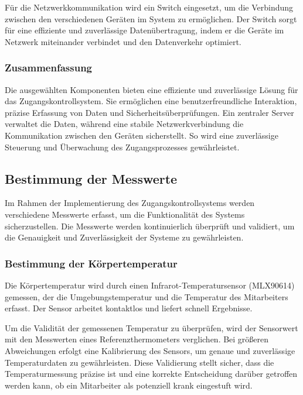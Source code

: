 Für die Netzwerkkommunikation wird ein Switch eingesetzt, um die Verbindung zwischen den verschiedenen Geräten im System zu ermöglichen. Der Switch sorgt für eine effiziente und zuverlässige Datenübertragung, indem er die Geräte im Netzwerk miteinander verbindet und den Datenverkehr optimiert.

\subsubsection{Zusammenfassung}

Die ausgewählten Komponenten bieten eine effiziente und zuverlässige Lösung für das Zugangskontrollsystem. Sie ermöglichen eine benutzerfreundliche Interaktion, präzise Erfassung von Daten und Sicherheitsüberprüfungen. Ein zentraler Server verwaltet die Daten, während eine stabile Netzwerkverbindung die Kommunikation zwischen den Geräten sicherstellt. So wird eine zuverlässige Steuerung und Überwachung des Zugangsprozesses gewährleistet.


\subsection{Bestimmung der Messwerte}

Im Rahmen der Implementierung des Zugangskontrollsystems werden verschiedene Messwerte erfasst, um die Funktionalität des Systems sicherzustellen. Die Messwerte werden kontinuierlich überprüft und validiert, um die Genauigkeit und Zuverlässigkeit der Systeme zu gewährleisten.

\subsubsection{Bestimmung der Körpertemperatur}

Die Körpertemperatur wird durch einen Infrarot-Temperatursensor (MLX90614) gemessen, der die Umgebungstemperatur und die Temperatur des Mitarbeiters erfasst. Der Sensor arbeitet kontaktlos und liefert schnell Ergebnisse.

\vspace{1em}
\noindent Um die Validität der gemessenen Temperatur zu überprüfen, wird der Sensorwert mit den Messwerten eines Referenzthermometers verglichen. Bei größeren Abweichungen erfolgt eine Kalibrierung des Sensors, um genaue und zuverlässige Temperaturdaten zu gewährleisten. Diese Validierung stellt sicher, dass die Temperaturmessung präzise ist und eine korrekte Entscheidung darüber getroffen werden kann, ob ein Mitarbeiter als potenziell krank eingestuft wird.

